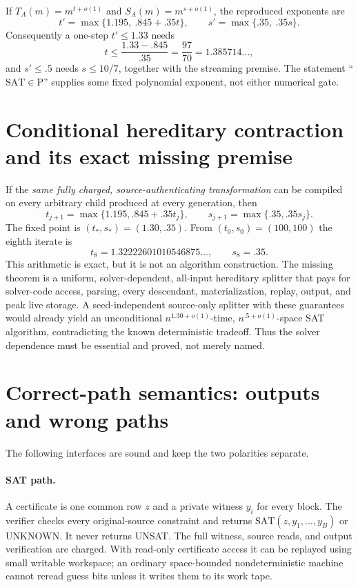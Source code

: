 \documentclass[11pt]{article}
\newcommand{\SAT}{\mathrm{SAT}}
\newcommand{\UNKNOWN}{\mathrm{UNKNOWN}}
\begin{document}
If $T_A(m)=m^{t+o(1)}$ and $S_A(m)=m^{s+o(1)}$, the reproduced exponents are
\[
 t'=\max\{1.195,\ .845+.35t\},\qquad
 s'=\max\{.35,\ .35s\}.
\]
Consequently a one-step $t'\le1.33$ needs
\[
 t\le\frac{1.33-.845}{.35}=\frac{97}{70}=1.385714\ldots,
\]
and $s'\le.5$ needs $s\le10/7$, together with the streaming premise.  The statement ``$\SAT\in\mathrm P$'' supplies some fixed polynomial exponent, not either numerical gate.

\section{Conditional hereditary contraction and its exact missing premise}

If the \emph{same fully charged, source-authenticating transformation} can be compiled on every arbitrary child produced at every generation, then
\[
 t_{j+1}=\max\{1.195,.845+.35t_j\},\qquad
 s_{j+1}=\max\{.35,.35s_j\}.
\]
The fixed point is $(t_*,s_*)=(1.30,.35)$.  From $(t_0,s_0)=(100,100)$ the eighth iterate is
\[
 t_8=1.32222601010546875\ldots,\qquad s_8=.35.
\]
This arithmetic is exact, but it is not an algorithm construction.  The missing theorem is a uniform, solver-dependent, all-input hereditary splitter that pays for solver-code access, parsing, every descendant, materialization, replay, output, and peak live storage.  A seed-independent source-only splitter with these guarantees would already yield an unconditional $n^{1.30+o(1)}$-time, $n^{.5+o(1)}$-space SAT algorithm, contradicting the known deterministic tradeoff.  Thus the solver dependence must be essential and proved, not merely named.

\section{Correct-path semantics: outputs and wrong paths}

The following interfaces are sound and keep the two polarities separate.

\paragraph{SAT path.}  A certificate is one common row $z$ and a private witness $y_i$ for every block.  The verifier checks every original-source constraint and returns $\SAT(z,y_1,\ldots,y_B)$ or $\UNKNOWN$.  It never returns UNSAT.  The full witness, source reads, and output verification are charged.  With read-only certificate access it can be replayed using small writable workspace; an ordinary space-bounded nondeterministic machine cannot reread guess bits unless it writes them to its work tape.
\end{document}
